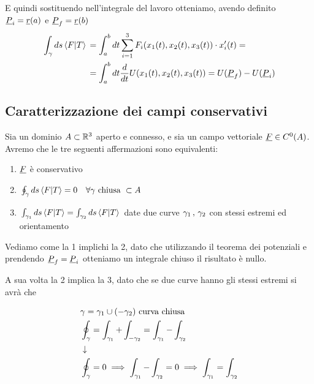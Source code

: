 E quindi sostituendo nell'integrale del lavoro otteniamo, avendo definito $\underline{P}_i = \underline{r}(a)$ e $\underline{P}_f = \underline{r}(b)$
\begin{align}
	\int_{\gamma} ds \braket{F|T} {}&= \int_{a}^{b} dt \sum_{i=1}^{3}F_i(x_1(t),x_2(t),x_3(t)) \cdot x'_i(t) = \nonumber \\ &=\int_{a}^{b} dt \frac{d }{d t}U(x_1(t) , x_2(t) , x_3(t)) = U(\underline{P}_f) - U(\underline{P}_i)
\end{align}

\subsection{Caratterizzazione dei campi conservativi}

Sia un dominio $A\subset \mathbb{R}^3$ aperto e connesso, e sia un campo vettoriale $\underline{F} \in C^0(A)$. Avremo che le tre seguenti affermazioni sono equivalenti:
\begin{enumerate}
	\item $\underline{F}$ è conservativo
	\item $\oint_\gamma ds \braket{F|T}=0 \quad \forall \gamma \text{ chiusa } \subset A$
	\item $\int_{\gamma_1}ds \braket{F|T} = \int_{\gamma_2}ds \braket{F|T}$ date due curve $\gamma_1 \, , \, \gamma_2$ con stessi estremi ed orientamento
\end{enumerate}

Vediamo come la 1 implichi la 2, dato che utilizzando il teorema dei potenziali e prendendo $\underline{P}_f=\underline{P}_i$ otteniamo un integrale chiuso il risultato è nullo.

\bigskip

A sua volta la 2 implica la 3, dato che se due curve hanno gli stessi estremi si avrà che
\begin{figure}[!htb]
\end{figure}
\begin{align}
	{}&\gamma = \gamma_1 \cup (-\gamma_2) \text{ curva chiusa}\\
	&\oint_\gamma = \int_{\gamma_1} + \int_{-\gamma_2} = \int_{\gamma_1} - \int_{\gamma_2} \nonumber \\ &\downarrow \nonumber \\
	& \oint_\gamma =0 \implies \int_{\gamma_1} - \int_{\gamma_2} = 0 \implies \int_{\gamma_1} = \int_{\gamma_2}
\end{align}

